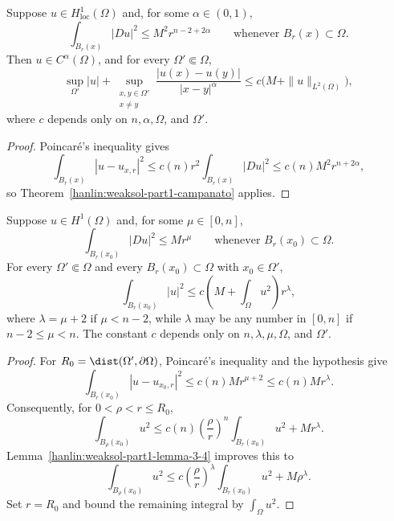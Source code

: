 \begin{corollary}\label{hanlin:weaksol-part1-morrey}
Suppose $u\in H^1_{\mathrm{loc}}(\Omega)$ and, for some
$\alpha\in(0,1)$,
\[
\int_{B_r(x)}|Du|^2\leq M^2r^{n-2+2\alpha}
\qquad\text{whenever }B_r(x)\subset\Omega.
\]
Then $u\in C^\alpha(\Omega)$, and for every $\Omega'\Subset\Omega$,
\[
\sup_{\Omega'}|u|+
\sup_{\substack{x,y\in\Omega'\\x\ne y}}
\frac{|u(x)-u(y)|}{|x-y|^\alpha}
\leq c\bigl(M+\|u\|_{L^2(\Omega)}\bigr),
\]
where $c$ depends only on $n,\alpha,\Omega$, and $\Omega'$.
\end{corollary}
\begin{proof}
\sketch Poincar\'e's inequality gives
\[
\int_{B_r(x)}|u-u_{x,r}|^2
\leq c(n)r^2\int_{B_r(x)}|Du|^2
\leq c(n)M^2r^{n+2\alpha},
\]
so Theorem~\ref{hanlin:weaksol-part1-campanato} applies.
\end{proof}

\begin{lemma}\label{hanlin:weaksol-part1-lemma-3-3}
Suppose $u\in H^1(\Omega)$ and, for some $\mu\in[0,n]$,
\[
\int_{B_r(x_0)}|Du|^2\leq Mr^\mu
\qquad\text{whenever }B_r(x_0)\subset\Omega.
\]
For every $\Omega'\Subset\Omega$ and every $B_r(x_0)\subset\Omega$ with
$x_0\in\Omega'$,
\[
\int_{B_r(x_0)}|u|^2
\leq c\left(M+\int_\Omega u^2\right)r^\lambda,
\]
where $\lambda=\mu+2$ if $\mu<n-2$, while $\lambda$ may be any number
in $[0,n]$ if $n-2\leq\mu<n$. The constant $c$ depends only on
$n,\lambda,\mu,\Omega$, and $\Omega'$.
\end{lemma}
\begin{proof}
\sketch For $R_0=\dist(\Omega',\partial\Omega)$, Poincar\'e's inequality
and the hypothesis give
\[
\int_{B_r(x_0)}|u-u_{x_0,r}|^2\leq c(n)Mr^{\mu+2}\leq c(n)Mr^\lambda.
\]
Consequently, for $0<\rho<r\leq R_0$,
\[
\int_{B_\rho(x_0)}u^2
\leq c(n)\left(\frac{\rho}{r}\right)^n
\int_{B_r(x_0)}u^2+Mr^\lambda.
\]
Lemma~\ref{hanlin:weaksol-part1-lemma-3-4} improves this to
\[
\int_{B_\rho(x_0)}u^2
\leq c\left(\frac{\rho}{r}\right)^\lambda
\int_{B_r(x_0)}u^2+M\rho^\lambda.
\]
Set $r=R_0$ and bound the remaining integral by $\int_\Omega u^2$.
\end{proof}

